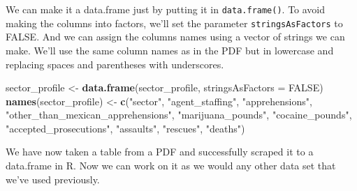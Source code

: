 \documentclass[
  12pt,
]{book}
\newenvironment{Shaded}{\begin{snugshade}}{\end{snugshade}}
\newcommand{\DataTypeTok}[1]{\textcolor[rgb]{0.27,0.27,0.27}{#1}}
\newcommand{\KeywordTok}[1]{\textcolor[rgb]{0.27,0.27,0.27}{\textbf{#1}}}
\newcommand{\NormalTok}[1]{#1}
\newcommand{\OtherTok}[1]{\textcolor[rgb]{0.37,0.37,0.37}{#1}}
\newcommand{\StringTok}[1]{\textcolor[rgb]{0.5,0.5,0.5}{#1}}
\begin{document}
We can make it a data.frame just by putting it in \texttt{data.frame()}. To avoid making the columns into factors, we'll set the parameter \texttt{stringsAsFactors} to FALSE. And we can assign the columns names using a vector of strings we can make. We'll use the same column names as in the PDF but in lowercase and replacing spaces and parentheses with underscores.

\begin{Shaded}
\begin{Highlighting}[]
\NormalTok{sector\_profile <{-}}\StringTok{ }\KeywordTok{data.frame}\NormalTok{(sector\_profile, }\DataTypeTok{stringsAsFactors =} \OtherTok{FALSE}\NormalTok{)}
\KeywordTok{names}\NormalTok{(sector\_profile) <{-}}\StringTok{ }\KeywordTok{c}\NormalTok{(}\StringTok{"sector"}\NormalTok{,}
                           \StringTok{"agent\_staffing"}\NormalTok{,}
                           \StringTok{"apprehensions"}\NormalTok{,}
                           \StringTok{"other\_than\_mexican\_apprehensions"}\NormalTok{, }
                           \StringTok{"marijuana\_pounds"}\NormalTok{,}
                           \StringTok{"cocaine\_pounds"}\NormalTok{,}
                           \StringTok{"accepted\_prosecutions"}\NormalTok{,}
                           \StringTok{"assaults"}\NormalTok{,}
                           \StringTok{"rescues"}\NormalTok{,}
                           \StringTok{"deaths"}\NormalTok{)}
\end{Highlighting}
\end{Shaded}

We have now taken a table from a PDF and successfully scraped it to a data.frame in R. Now we can work on it as we would any other data set that we've used previously.
\end{document}

